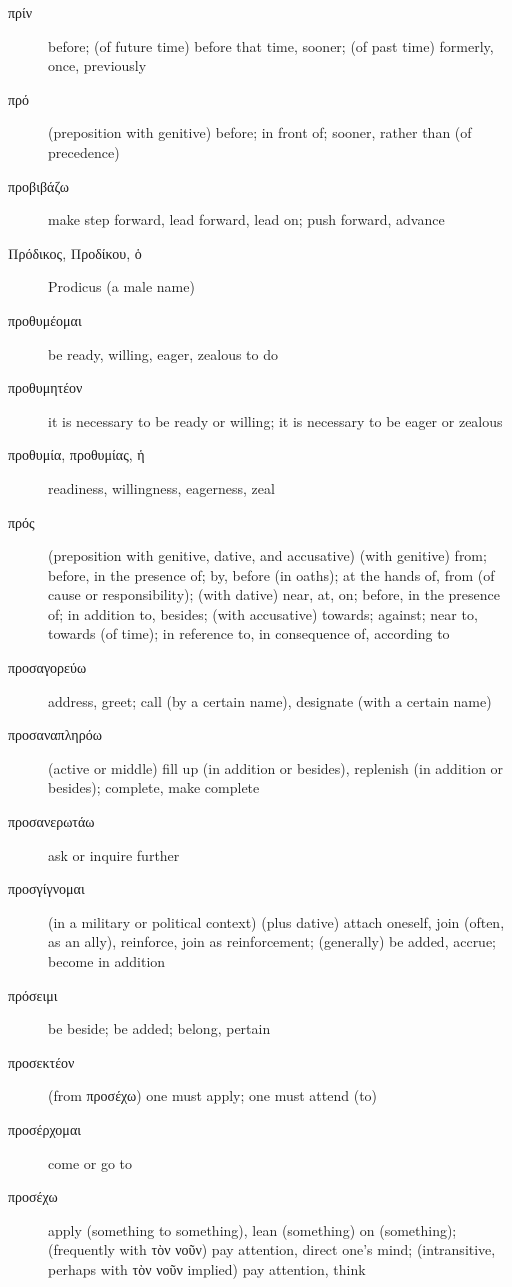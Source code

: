 \documentclass[12pt,letterpaper]{article}
\begin{document}
\begin{description}
    \item[\textgreek{πρίν}] \marginnote{*}before; (of future time) before that time, sooner; (of past time) formerly, once, previously
    \item[\textgreek{πρό}] \marginnote{*}(preposition with genitive) before; in front of; sooner, rather than (of precedence)
    \item[\textgreek{προβιβάζω}] make step forward, lead forward, lead on; push forward, advance
    \item[\textgreek{Πρόδικος, Προδίκου, ὁ}] Prodicus (a male name)
    \item[\textgreek{προθυμέομαι}] be ready, willing, eager, zealous to do
    \item[\textgreek{προθυμητέον}] it is necessary to be ready or willing; it is necessary to be eager or zealous
    \item[\textgreek{προθυμία, προθυμίας, ἡ}] readiness, willingness, eagerness, zeal
    \item[\textgreek{πρός}] \marginnote{*}(preposition with genitive, dative, and accusative) (with genitive) from; before, in the presence of; by, before (in oaths); at the hands of, from (of cause or responsibility); (with dative) near, at, on; before, in the presence of; in addition to, besides; (with accusative) towards; against; near to, towards (of time); in reference to, in consequence of, according to
    \item[\textgreek{προσαγορεύω}] address, greet; call (by a certain name), designate (with a certain name)
    \item[\textgreek{προσαναπληρόω}] (active or middle) fill up (in addition or besides), replenish (in addition or besides); complete, make complete
    \item[\textgreek{προσανερωτάω}] ask or inquire further
    \item[\textgreek{προσγίγνομαι}] (in a military or political context)  (plus dative) attach oneself, join (often, as an ally), reinforce, join as reinforcement; (generally) be added, accrue; become in addition
    \item[\textgreek{πρόσειμι}] be beside; be added; belong, pertain
    \item[\textgreek{προσεκτέον}] (from \textgreek{προσέχω}) one must apply; one must attend (to)
    \item[\textgreek{προσέρχομαι}] come or go to
    \item[\textgreek{προσέχω}] apply (something to something), lean (something) on (something); (frequently with \textgreek{τὸν νοῦν}) pay attention, direct one's mind; (intransitive, perhaps with \textgreek{τὸν νοῦν} implied) pay attention, think

\end{description}
\end{document}
